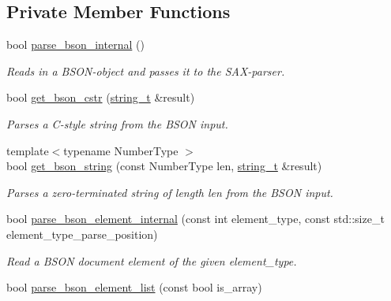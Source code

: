 \subsection*{Private Member Functions}
\begin{DoxyCompactItemize}
\item 
bool \mbox{\hyperlink{classnlohmann_1_1detail_1_1binary__reader_a950f6ef800421fef9499af1c4c8918f5}{parse\+\_\+bson\+\_\+internal}} ()
\begin{DoxyCompactList}\small\item\em Reads in a B\+S\+O\+N-\/object and passes it to the S\+A\+X-\/parser. \end{DoxyCompactList}\item 
bool \mbox{\hyperlink{classnlohmann_1_1detail_1_1binary__reader_a075d20a35a09496c504c7dff135823ed}{get\+\_\+bson\+\_\+cstr}} (\mbox{\hyperlink{classnlohmann_1_1detail_1_1binary__reader_aa0b9729917ca7ee6ed01e3792341316e}{string\+\_\+t}} \&result)
\begin{DoxyCompactList}\small\item\em Parses a C-\/style string from the B\+S\+ON input. \end{DoxyCompactList}\item 
{\footnotesize template$<$typename Number\+Type $>$ }\\bool \mbox{\hyperlink{classnlohmann_1_1detail_1_1binary__reader_a46bf64d7193eea97cac6dd4d4abdb4fa}{get\+\_\+bson\+\_\+string}} (const Number\+Type len, \mbox{\hyperlink{classnlohmann_1_1detail_1_1binary__reader_aa0b9729917ca7ee6ed01e3792341316e}{string\+\_\+t}} \&result)
\begin{DoxyCompactList}\small\item\em Parses a zero-\/terminated string of length {\itshape len} from the B\+S\+ON input. \end{DoxyCompactList}\item 
bool \mbox{\hyperlink{classnlohmann_1_1detail_1_1binary__reader_a2fdd24de008063e7fef896327daeffa1}{parse\+\_\+bson\+\_\+element\+\_\+internal}} (const int element\+\_\+type, const std\+::size\+\_\+t element\+\_\+type\+\_\+parse\+\_\+position)
\begin{DoxyCompactList}\small\item\em Read a B\+S\+ON document element of the given {\itshape element\+\_\+type}. \end{DoxyCompactList}\item 
bool \mbox{\hyperlink{classnlohmann_1_1detail_1_1binary__reader_a7316619ace9efdc718d04e7b8f807e1e}{parse\+\_\+bson\+\_\+element\+\_\+list}} (const bool is\+\_\+array)

\end{DoxyCompactItemize}

